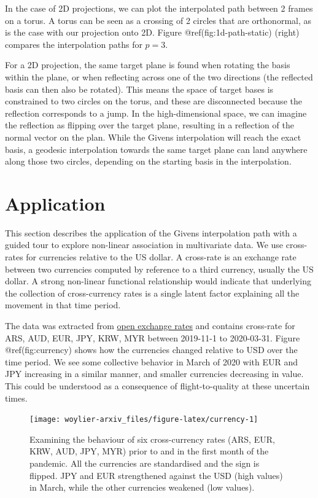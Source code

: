\documentclass[
]{article}
\begin{document}
In the case of 2D projections, we can plot the interpolated path between
2 frames on a torus. A torus can be seen as a crossing of 2 circles that
are orthonormal, as is the case with our projection onto 2D. Figure
@ref(fig:1d-path-static) (right) compares the interpolation paths for
\(p=3\).

For a 2D projection, the same target plane is found when rotating the
basis within the plane, or when reflecting across one of the two
directions (the reflected basis can then also be rotated). This means
the space of target bases is constrained to two circles on the torus,
and these are disconnected because the reflection corresponds to a jump.
In the high-dimensional space, we can imagine the reflection as flipping
over the target plane, resulting in a reflection of the normal vector on
the plan. While the Givens interpolation will reach the exact basis, a
geodesic interpolation towards the same target plane can land anywhere
along those two circles, depending on the starting basis in the
interpolation.

\hypertarget{application}{%
\section{Application}\label{application}}

This section describes the application of the Givens interpolation path
with a guided tour to explore non-linear association in multivariate
data. We use cross-rates for currencies relative to the US dollar. A
cross-rate is an exchange rate between two currencies computed by
reference to a third currency, usually the US dollar. A strong
non-linear functional relationship would indicate that underlying the
collection of cross-currency rates is a single latent factor explaining
all the movement in that time period.

The data was extracted from \href{https://openexchangerates.org}{open
exchange rates} and contains cross-rate for ARS, AUD, EUR, JPY, KRW, MYR
between 2019-11-1 to 2020-03-31. Figure @ref(fig:currency) shows how the
currencies changed relative to USD over the time period. We see some
collective behavior in March of 2020 with EUR and JPY increasing in a
similar manner, and smaller currencies decreasing in value. This could
be understood as a consequence of flight-to-quality at these uncertain
times.

\begin{figure}
\texttt{[image: woylier-arxiv\_files/figure-latex/currency-1]} \caption{Examining the behaviour of six cross-currency rates (ARS, EUR, KRW, AUD, JPY, MYR) prior to and in the first month of the pandemic. All the currencies are standardised and the sign is flipped. JPY and EUR strengthened against the USD (high values) in March, while the other currencies weakened (low values).}\label{fig:currency}
\end{figure}
\end{document}
